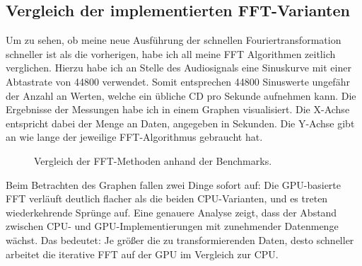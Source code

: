 \documentclass[a4paper,12pt]{article}
\theoremstyle{definition}
\theoremstyle{remark}
\begin{document}
\subsection{Vergleich der implementierten FFT-Varianten}
Um zu sehen, ob meine neue Ausführung der schnellen Fouriertransformation schneller ist als die vorherigen, habe ich all meine FFT 
Algorithmen zeitlich verglichen. Hierzu habe ich an Stelle des Audiosignals eine Sinuskurve mit einer Abtastrate von 44800 verwendet. 
Somit entsprechen 44800 Sinuswerte ungefähr der Anzahl an Werten, welche ein übliche CD pro Sekunde aufnehmen kann. Die Ergebnisse der 
Messungen habe ich in einem Graphen visualisiert. Die X-Achse entspricht dabei der Menge an Daten, angegeben in Sekunden. Die Y-Achse 
gibt an wie lange der jeweilige FFT-Algorithmus gebraucht hat. 
\begin{figure}[H]
  \centering
  \caption{Vergleich der FFT-Methoden anhand der Benchmarks.}
\end{figure}

Beim Betrachten des Graphen fallen zwei Dinge sofort auf: Die GPU-basierte FFT verläuft deutlich flacher als die beiden CPU-Varianten, 
und es treten wiederkehrende Sprünge auf. Eine genauere Analyse zeigt, dass der Abstand zwischen CPU- und GPU-Implementierungen mit 
zunehmender Datenmenge wächst. Das bedeutet: Je größer die zu transformierenden Daten, desto schneller arbeitet die iterative FFT auf 
der GPU im Vergleich zur CPU.
\end{document}
